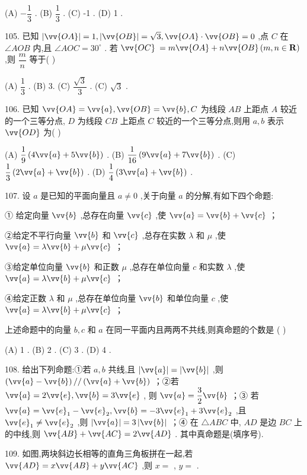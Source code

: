 (A) $- \dfrac{1}{3}$ . (B) $\dfrac{1}{3}$ . (C) -1 . (D) 1 .

105. 已知 $\left| \vv{OA}\right|  = 1,\left| \vv{OB}\right|  = \sqrt{3},\vv{OA} \cdot  \vv{OB} = 0$ ,点 $C$ 在 $\angle {AOB}$ 内,且 $\angle {AOC} = {30}^{ \circ  }$ . 若 $\vv{OC}$  $= m\vv{OA} + n\vv{OB}\left( {m,n \in  \mathbf{R}}\right)$ ,则 $\dfrac{m}{n}$ 等于(   )

(A) $\dfrac{1}{3}$ . (B) 3. (C) $\dfrac{\sqrt{3}}{3}$ . (C) $\sqrt{3}$ .

106. 已知 $\vv{OA} = \vv{a},\vv{OB} = \vv{b},C$ 为线段 ${AB}$ 上距点 $A$ 较近的一个三等分点, $D$ 为线段 ${CB}$ 上距点 $C$ 较近的一个三等分点,则用 $a,b$ 表示 $\vv{OD}$ 为(   )

(A) $\dfrac{1}{9}\left( {4\vv{a} + 5\vv{b}}\right)$ . (B) $\dfrac{1}{16}\left( {9\vv{a} + 7\vv{b}}\right)$ . (C) $\dfrac{1}{3}\left( {2\vv{a} + \vv{b}}\right)$ . (D) $\dfrac{1}{4}\left( {3\vv{a} + \vv{b}}\right)$ .

107. 设 $a$ 是已知的平面向量且 $a \neq  0$ ,关于向量 $a$ 的分解,有如下四个命题:

① 给定向量 $\vv{b}$ ,总存在向量 $\vv{c}$ ,使 $\vv{a} = \vv{b} + \vv{c}$ ；

②给定不平行向量 $\vv{b}$ 和 $\vv{c}$ ,总存在实数 $\lambda$ 和 $\mu$ ,使 $\vv{a} = \lambda \vv{b} + \mu \vv{c}$ ；

③给定单位向量 $\vv{b}$ 和正数 $\mu$ ,总存在单位向量 $c$ 和实数 $\lambda$ ,使 $\vv{a} = \lambda \vv{b} + \mu \vv{c}$ ；

④给定正数 $\lambda$ 和 $\mu$ ,总存在单位向量 $\vv{b}$ 和单位向量 $c$ ,使 $\vv{a} = \lambda \vv{b} + \mu \vv{c}$ ；

上述命题中的向量 $b,c$ 和 $a$ 在同一平面内且两两不共线,则真命题的个数是 (   )

(A) 1 . (B) 2 . (C) 3 . (D) 4 .

108. 给出下列命题:①若 $a,b$ 共线,且 $\left| \vv{a}\right|  = \left| \vv{b}\right|$ ,则 $\left( {\vv{a} - \vv{b}}\right) //\left( {\vv{a} + \vv{b}}\right)$ ；②若 $\vv{a} = 2\vv{e},\vv{b} = 3\vv{e}$ , 则 $\vv{a} = \dfrac{3}{2}\vv{b}$ ；③ 若 $\vv{a} = {\vv{e}}_{1} - {\vv{e}}_{2},\vv{b} =  - 3{\vv{e}}_{1} + 3{\vv{e}}_{2}$ ,且 ${\vv{e}}_{1} \neq  {\vv{e}}_{2}$ ,则 $\left| \vv{a}\right|  = 3\left| \vv{b}\right|$ ；④ 在 $\bigtriangleup  {ABC}$ 中, ${AD}$ 是边 ${BC}$ 上的中线,则 $\vv{AB} + \vv{AC} = 2\vv{AD}$ . 其中真命题是\blkda{}(填序号).

109. 如图,两块斜边长相等的直角三角板拼在一起,若 $\vv{AD} = x\vv{AB} + y\vv{AC}$ ,则 $x =$ \blkda{}, $y =$ \blkda{}.

